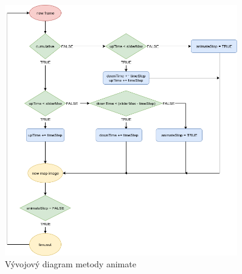 \begin{figure}[h!]
\centering
\includegraphics[width=0.9\textwidth]{./img/animate.png}
\caption{Vývojový diagram metody animate}
\label{fig:animate-chart}
\end{figure}
